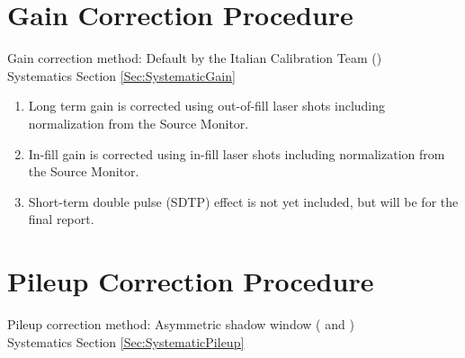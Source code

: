 \section{Gain Correction Procedure}

	Gain correction method: Default by the Italian Calibration Team () \\
	\noindent Systematics Section \ref{Sec:SystematicGain}

	\begin{enumerate}
		\item{Long term gain is corrected using out-of-fill laser shots including normalization from the Source Monitor.}
		\item{In-fill gain is corrected using in-fill laser shots including normalization from the Source Monitor.}
		\item{Short-term double pulse (SDTP) effect is not yet included, but will be for the final report.}
	\end{enumerate}


\section{Pileup Correction Procedure}
\label{Sec:PileupCorrection}

	Pileup correction method: Asymmetric shadow window ( and ) \\
	\noindent Systematics Section \ref{Sec:SystematicPileup}

